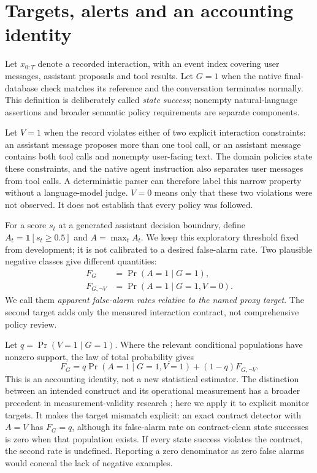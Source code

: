 \documentclass[10pt]{article}
\newcommand{\ind}{\mathbf{1}}
\begin{document}
\section{Targets, alerts and an accounting identity}
\label{sec:targets}
Let $x_{0:T}$ denote a recorded interaction, with an event index covering user messages, assistant proposals and tool results. Let $G=1$ when the native final-database check matches its reference and the conversation terminates normally. This definition is deliberately called \emph{state success}; nonempty natural-language assertions and broader semantic policy requirements are separate components.

Let $V=1$ when the record violates either of two explicit interaction constraints: an assistant message proposes more than one tool call, or an assistant message contains both tool calls and nonempty user-facing text. The domain policies state these constraints, and the native agent instruction also separates user messages from tool calls. A deterministic parser can therefore label this narrow property without a language-model judge. $V=0$ means only that these two violations were not observed. It does not establish that every policy was followed.

For a score $s_t$ at a generated assistant decision boundary, define $A_t=\ind[s_t\geq 0.5]$ and $A=\max_t A_t$. We keep this exploratory threshold fixed from development; it is not calibrated to a desired false-alarm rate. Two plausible negative classes give different quantities:
\begin{align}
 F_G &= \Pr(A=1\mid G=1),\\
 F_{G,\neg V} &= \Pr(A=1\mid G=1,V=0).
\end{align}
We call them \emph{apparent false-alarm rates relative to the named proxy target}. The second target adds only the measured interaction contract, not comprehensive policy review.

Let $q=\Pr(V=1\mid G=1)$. Where the relevant conditional populations have nonzero support, the law of total probability gives
\begin{equation}
 F_G=q\Pr(A=1\mid G=1,V=1)+(1-q)F_{G,\neg V}.
 \label{eq:decomposition}
\end{equation}
This is an accounting identity, not a new statistical estimator. The distinction between an intended construct and its operational measurement has a broader precedent in measurement-validity research \citep{jacobs2021measurement}; here we apply it to explicit monitor targets. It makes the target mismatch explicit: an exact contract detector with $A=V$ has $F_G=q$, although its false-alarm rate on contract-clean state successes is zero when that population exists. If every state success violates the contract, the second rate is undefined. Reporting a zero denominator as zero false alarms would conceal the lack of negative examples.
\end{document}
